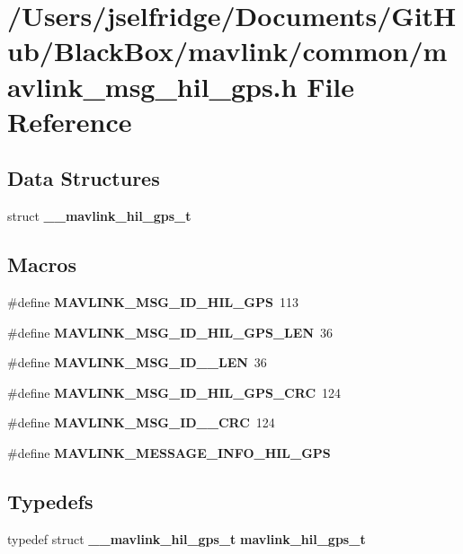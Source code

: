 \section{/\+Users/jselfridge/\+Documents/\+Git\+Hub/\+Black\+Box/mavlink/common/mavlink\+\_\+msg\+\_\+hil\+\_\+gps.h File Reference}
\label{mavlink__msg__hil__gps_8h}
\subsection*{Data Structures}
\begin{DoxyCompactItemize}
\item 
struct \textbf{ \+\_\+\+\_\+mavlink\+\_\+hil\+\_\+gps\+\_\+t}
\end{DoxyCompactItemize}
\subsection*{Macros}
\begin{DoxyCompactItemize}
\item 
\#define \textbf{ M\+A\+V\+L\+I\+N\+K\+\_\+\+M\+S\+G\+\_\+\+I\+D\+\_\+\+H\+I\+L\+\_\+\+G\+PS}~113
\item 
\#define \textbf{ M\+A\+V\+L\+I\+N\+K\+\_\+\+M\+S\+G\+\_\+\+I\+D\+\_\+\+H\+I\+L\+\_\+\+G\+P\+S\+\_\+\+L\+EN}~36
\item 
\#define \textbf{ M\+A\+V\+L\+I\+N\+K\+\_\+\+M\+S\+G\+\_\+\+I\+D\+\_\+\_\+\+L\+EN}~36
\item 
\#define \textbf{ M\+A\+V\+L\+I\+N\+K\+\_\+\+M\+S\+G\+\_\+\+I\+D\+\_\+\+H\+I\+L\+\_\+\+G\+P\+S\+\_\+\+C\+RC}~124
\item 
\#define \textbf{ M\+A\+V\+L\+I\+N\+K\+\_\+\+M\+S\+G\+\_\+\+I\+D\+\_\+\_\+\+C\+RC}~124
\item 
\#define \textbf{ M\+A\+V\+L\+I\+N\+K\+\_\+\+M\+E\+S\+S\+A\+G\+E\+\_\+\+I\+N\+F\+O\+\_\+\+H\+I\+L\+\_\+\+G\+PS}
\end{DoxyCompactItemize}
\subsection*{Typedefs}
\begin{DoxyCompactItemize}
\item 
typedef struct \textbf{ \+\_\+\+\_\+mavlink\+\_\+hil\+\_\+gps\+\_\+t} \textbf{ mavlink\+\_\+hil\+\_\+gps\+\_\+t}
\end{DoxyCompactItemize}


